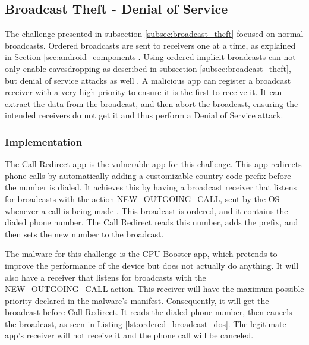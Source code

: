     \subsection{Broadcast Theft - Denial of Service}
        \label{subsec:broadcast_theft_dos}
        
    The challenge presented in subsection \ref{subsec:broadcast_theft} focused on normal broadcasts. Ordered broadcasts are sent to receivers one at a time, as explained in Section \ref{sec:android_components}. Using ordered implicit broadcasts can not only enable eavesdropping as described in subsection \ref{subsec:broadcast_theft}, but denial of service attacks as well \cite{2010_icc_paper}. A malicious app can register a broadcast receiver with a very high priority to ensure it is the first to receive it. It can extract the data from the broadcast, and then abort the broadcast, ensuring the intended receivers do not get it and thus perform a Denial of Service attack.
    
    \subsubsection{Implementation}
        \label{subsubsec:broadcast_theft_dos_implementation}

    The Call Redirect app is the vulnerable app for this challenge. This app redirects phone calls by automatically adding a customizable country code prefix before the number is dialed. It achieves this by having a broadcast receiver that listens for broadcasts with the action NEW\_OUTGOING\_CALL, sent by the OS whenever a call is being made \cite{intents}. This broadcast is ordered, and it contains the dialed phone number. The Call Redirect reads this number, adds the prefix, and then sets the new number to the broadcast.
    
    The malware for this challenge is the CPU Booster app, which pretends to improve the performance of the device but does not actually do anything. It will also have a receiver that listens for broadcasts with the NEW\_OUTGOING\_CALL action. This receiver will have the maximum possible priority declared in the malware's manifest. Consequently, it will get the broadcast before Call Redirect. It reads the dialed phone number, then cancels the broadcast, as seen in Listing \ref{lst:ordered_broadcast_dos}. The legitimate app's receiver will not receive it and the phone call will be canceled.
    
    
    
